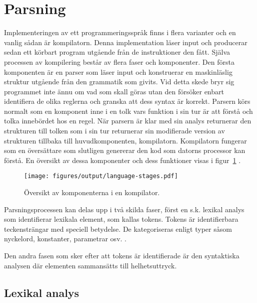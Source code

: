 \section{Parsning}

Implementeringen av ett programmeringsspråk finns i flera varianter och en
vanlig sådan är kompilatorn. Denna implementation läser input och producerar
sedan ett körbart program utgående från de instruktioner den fått.  Själva
processen av kompilering består av flera faser och komponenter. Den första
komponenten är en parser som läser input och konstruerar en maskinläslig
struktur utgående från den grammatik som givits. Vid detta skede bryr sig
programmet inte ännu om vad som skall göras utan den försöker enbart
identifiera de olika reglerna och granska att dess syntax är korrekt. Parsern
körs normalt som en komponent inne i en tolk vars funktion i sin tur är att
förstå och tolka innebördet hos en regel. När parsern är klar med sin analys
returnerar den strukturen till tolken som i sin tur returnerar sin modifierade
version av strukturen tillbaka till huvudkomponenten, kompilatorn. Kompilatorn
fungerar som en översättare som slutligen genererar den kod som datorns
processor kan förstå. En översikt av dessa komponenter och dess funktioner
visas i figur~\ref{fig:compiler} \citep[s. 16]{pt10}.

\begin{figure}[ht]
  \texttt{[image: figures/output/language-stages.pdf]}
  \caption{Översikt av komponenterna i en kompilator.}
  \label{fig:compiler}
\end{figure}

Parsningsprocessen kan delas upp i två skilda faser, först en s.k.
lexikal analys som identifierar lexikala element, som kallas tokens. Tokens
är identifierbara teckensträngar med speciell betydelse. De kategoriseras
enligt typer såsom nyckelord, konstanter, parametrar osv. \citep[s. 6]{aa06}.

Den andra fasen som sker efter att tokens är identifierade är den syntaktiska
analysen där elementen sammansätts till helhetsuttryck.

\subsection{Lexikal analys}

